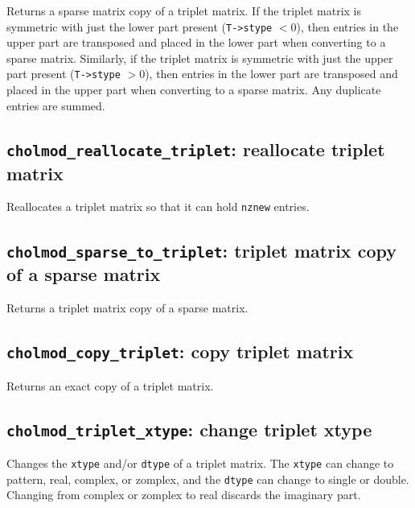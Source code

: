 \documentclass[11pt]{article}
\begin{document}

Returns a sparse matrix copy of a triplet matrix.  If the triplet matrix is
symmetric with just the lower part present ({\tt T->stype} $< 0$), then entries
in the upper part are transposed and placed in the lower part when converting
to a sparse matrix.  Similarly, if the triplet matrix is symmetric with just
the upper part present ({\tt T->stype} $> 0$), then entries in the lower part
are transposed and placed in the upper part when converting to a sparse matrix.
Any duplicate entries are summed.

\subsection{{\tt cholmod\_reallocate\_triplet}: reallocate triplet matrix}


Reallocates a triplet matrix so that it can hold {\tt nznew} entries.

\subsection{{\tt cholmod\_sparse\_to\_triplet}: triplet matrix copy of a sparse matrix}


Returns a triplet matrix copy of a sparse matrix.

\subsection{{\tt cholmod\_copy\_triplet}: copy triplet matrix}


Returns an exact copy of a triplet matrix.

\subsection{{\tt cholmod\_triplet\_xtype}: change triplet xtype}


Changes the {\tt xtype} and/or \verb'dtype' of a triplet matrix.
The \verb'xtype' can change to pattern, real, complex, or zomplex,
and the \verb'dtype' can change to single or double.
Changing from complex or zomplex to real discards the imaginary part.
\end{document}
